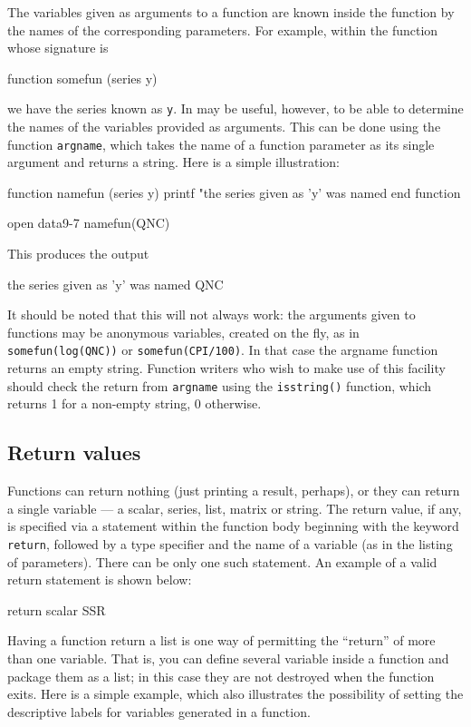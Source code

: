 The variables given as arguments to a function are known inside the
function by the names of the corresponding parameters.  For example,
within the function whose signature is
%
\begin{code}
function somefun (series y)
\end{code}
%
we have the series known as \texttt{y}.  In may be useful, however, to
be able to determine the names of the variables provided as arguments.
This can be done using the function \texttt{argname}, which takes the
name of a function parameter as its single argument and returns a
string.  Here is a simple illustration:
%
\begin{code}
function namefun (series y)
  printf "the series given as 'y' was named %
end function

open data9-7
namefun(QNC)
\end{code}
%
This produces the output
%
\begin{code}
the series given as 'y' was named QNC
\end{code}

It should be noted that this will not always work: the arguments given
to functions may be anonymous variables, created on the fly, as in
\texttt{somefun(log(QNC))} or \texttt{somefun(CPI/100)}.  In that case
the \textsf{argname} function returns an empty string.  Function
writers who wish to make use of this facility should check the return
from \texttt{argname} using the \texttt{isstring()} function, which
returns 1 for a non-empty string, 0 otherwise.


\subsection{Return values}

Functions can return nothing (just printing a result, perhaps), or
they can return a single variable --- a scalar, series, list, matrix
or string.  The return value, if any, is specified via a statement
within the function body beginning with the keyword \verb+return+,
followed by a type specifier and the name of a variable (as in the
listing of parameters).  There can be only one such statement.  An
example of a valid return statement is shown below:
%    
\begin{code}
return scalar SSR
\end{code}
%
Having a function return a list is one way of permitting the
``return'' of more than one variable.  That is, you can define several
variable inside a function and package them as a list; in this case
they are not destroyed when the function exits.  Here is a simple
example, which also illustrates the possibility of setting the
descriptive labels for variables generated in a function.
%    


